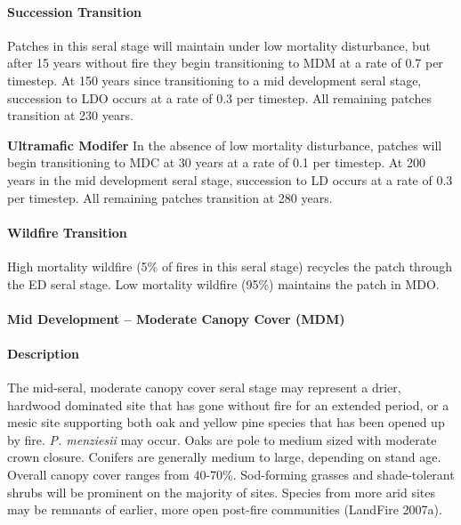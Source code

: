 \paragraph{Succession Transition} Patches in this seral stage will maintain under low mortality disturbance, but after 15 years without fire they begin transitioning to MDM at a rate of 0.7 per timestep. At 150 years since transitioning to a mid development seral stage, succession to LDO occurs at a rate of 0.3 per timestep. All remaining patches transition at 230 years. 
\begin{adjustwidth}{2cm}{}

\textbf{Ultramafic Modifer}  In the absence of low mortality disturbance, patches will begin transitioning to MDC at 30 years at a rate of 0.1 per timestep. At 200 years in the mid development seral stage, succession to LD occurs at a rate of 0.3 per timestep. All remaining patches transition at 280 years.

\end{adjustwidth}
\paragraph{Wildfire Transition}
High mortality wildfire (5\% of fires in this seral stage) recycles the patch through the ED seral stage. Low mortality wildfire (95\%) maintains the patch in MDO.
\noindent\hrulefill

\paragraph{Mid Development – Moderate Canopy Cover (MDM)}

\paragraph{Description} The mid-seral, moderate canopy cover seral stage may represent a drier, hardwood dominated site that has gone without fire for an extended period, or a mesic site supporting both oak and yellow pine species that has been opened up by fire. \emph{P. menziesii} may occur. Oaks are pole to medium sized with moderate crown closure. Conifers are generally medium to large, depending on stand age. Overall canopy cover ranges from 40-70\%. Sod-forming grasses and shade-tolerant shrubs will be prominent on the majority of sites. Species from more arid sites may be remnants of earlier, more open post-fire communities (LandFire 2007a).

